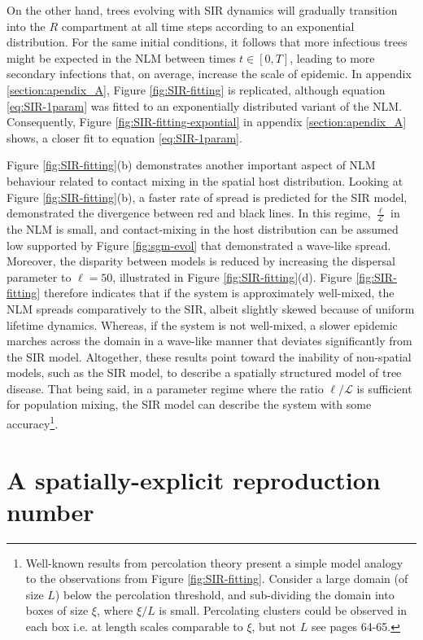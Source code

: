 On the other hand, trees evolving with SIR dynamics will gradually transition into the $R$ compartment at all time steps according to an exponential distribution. 
For the same initial conditions, it follows that more infectious trees might be expected in the NLM between times $t\in [0, T]$, leading to more secondary infections that, on average, increase the scale of epidemic.
In appendix \ref{section:apendix_A}, Figure \ref{fig:SIR-fitting} is replicated, although equation \ref{eq:SIR-1param} was fitted to an exponentially distributed variant of the NLM.
Consequently, Figure \ref{fig:SIR-fitting-expontial} in appendix \ref{section:apendix_A} shows, a closer fit to equation \ref{eq:SIR-1param}.
 
Figure \ref{fig:SIR-fitting}(b) demonstrates another important aspect of NLM behaviour related to contact mixing in the spatial host distribution.
Looking at Figure \ref{fig:SIR-fitting}(b), a faster rate of spread is predicted for the SIR model,
demonstrated the divergence between red and black lines.
In this regime, $\frac{\ell}{\mathcal{L}}$ in the NLM is small, and contact-mixing in the host distribution can be assumed low \textemdash supported by Figure \ref{fig:sgm-evol} that demonstrated a wave-like spread. 
Moreover, the disparity between models is reduced by increasing the dispersal parameter to $\ell=50$, illustrated in Figure \ref{fig:SIR-fitting}(d).
Figure \ref{fig:SIR-fitting} therefore indicates that if the system is approximately well-mixed, the NLM spreads comparatively to the SIR, albeit slightly skewed because of uniform lifetime dynamics.
Whereas, if the system is not well-mixed, a slower epidemic marches across the domain in a wave-like manner that deviates significantly from the SIR model.
Altogether, these results point toward the inability of non-spatial models, such as the SIR model, to describe a spatially structured model of tree disease. That being said, in a parameter regime where the ratio $\ell / \mathcal{L}$ is sufficient for population mixing, the SIR model can describe the system with some accuracy\footnote{
Well-known results from percolation theory present a simple model analogy to the observations from Figure \ref{fig:SIR-fitting}.
Consider a large domain (of size $L$) below the percolation threshold, and sub-dividing the domain into boxes of size $\xi$, where $\xi / L$ is small.
Percolating clusters could be observed in each box i.e. at length scales comparable to $\xi$, but not $L$ see \cite{stauffer2018introduction} pages 64-65.}.


\section{A spatially-explicit reproduction number}
\label{sec:spatially-explicit-reproduction-ration}

